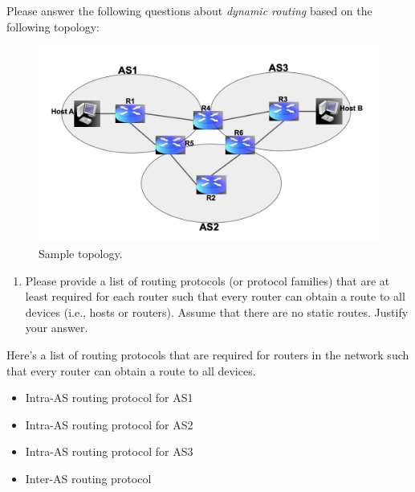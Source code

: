
Please answer the following questions about \textit{dynamic routing} based 
on the following topology:

\begin{figure}[H]
    \begin{center}
        \includegraphics[scale=0.25]{q2.png}
        \caption{Sample topology.}
        \label{fig:q2.png}
    \end{center}
\end{figure}

\begin{enumerate}
    \item
Please provide a list of routing protocols (or protocol families) that are at least required for each
router such that every router can obtain a route to all devices (i.e., hosts or routers). Assume
that there are no static routes. Justify your answer.
\end{enumerate}

\begin{tcolorbox}
    \mysolution{} 
    Here's a list of routing protocols that are required for routers in the network such that 
    every router can obtain a route to all devices. 
    \begin{itemize}
        \item Intra-AS routing protocol for AS1
        \item Intra-AS routing protocol for AS2
        \item Intra-AS routing protocol for AS3
        \item Inter-AS routing protocol
    \end{itemize}
\end{tcolorbox}

